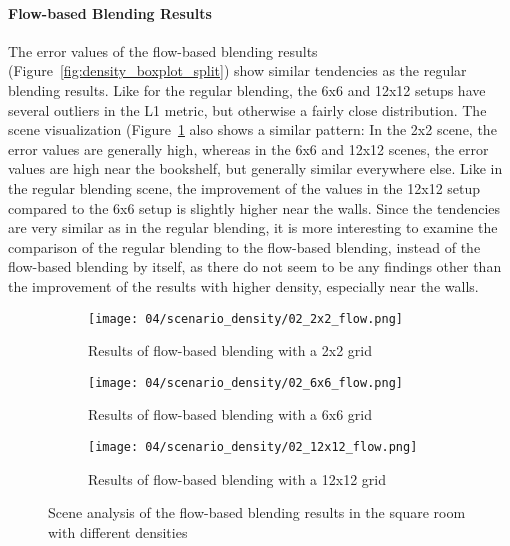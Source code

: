 \paragraph{Flow-based Blending Results}
The error values of the flow-based blending results (Figure~\ref{fig:density_boxplot_split}) show similar tendencies as the regular blending results. Like for the regular blending, the 6x6 and 12x12 setups have several outliers in the L1 metric, but otherwise a fairly close distribution. The scene visualization (Figure~\ref{fig:density_flow_scene_analysis} also shows a similar pattern: In the 2x2 scene, the error values are generally high, whereas in the 6x6 and 12x12 scenes, the error values are high near the bookshelf, but generally similar everywhere else. Like in the regular blending scene, the improvement of the values in the 12x12 setup compared to the 6x6 setup is slightly higher near the walls. Since the tendencies are very similar as in the regular blending, it is more interesting to examine the comparison of the regular blending to the flow-based blending, instead of the flow-based blending by itself, as there do not seem to be any findings other than the improvement of the results with higher density, especially near the walls.

\begin{figure}
\centering
    \hfill
    \begin{subfigure}[b]{0.32\textwidth}
            \centering
            \texttt{[image: 04/scenario\_density/02\_2x2\_flow.png]}
            \caption{Results of flow-based blending with a 2x2 grid}
    \end{subfigure}
    \hfill
    \begin{subfigure}[b]{0.32\textwidth}
            \centering
            \texttt{[image: 04/scenario\_density/02\_6x6\_flow.png]}
            \caption{Results of flow-based blending with a 6x6 grid}
    \end{subfigure}
    \hfill
    \begin{subfigure}[b]{0.32\textwidth}
            \centering
            \texttt{[image: 04/scenario\_density/02\_12x12\_flow.png]}
            \caption{Results of flow-based blending with a 12x12 grid}
    \end{subfigure}
    \hfill
  \caption{Scene analysis of the flow-based blending results in the square room with different densities} \label{fig:density_flow_scene_analysis}
\end{figure}


